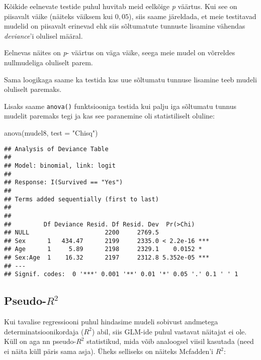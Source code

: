 \documentclass[
]{book}
\newenvironment{Shaded}{\begin{snugshade}}{\end{snugshade}}
\newcommand{\AttributeTok}[1]{\textcolor[rgb]{0.77,0.63,0.00}{#1}}
\newcommand{\FunctionTok}[1]{\textcolor[rgb]{0.00,0.00,0.00}{#1}}
\newcommand{\NormalTok}[1]{#1}
\newcommand{\OtherTok}[1]{\textcolor[rgb]{0.56,0.35,0.01}{#1}}
\newcommand{\SpecialCharTok}[1]{\textcolor[rgb]{0.00,0.00,0.00}{#1}}
\newcommand{\StringTok}[1]{\textcolor[rgb]{0.31,0.60,0.02}{#1}}
\begin{document}
Kõikide eelnevate testide puhul huvitab meid eelkõige \emph{p} väärtus. Kui see on piisavalt väike (näiteks väiksem kui \(0,05\)), siis saame järeldada, et meie testitavad mudelid on piisavalt erinevad ehk siis sõltumatute tunnuste lisamine vähendas \emph{deviance}'i olulisel määral.

Eelnevas näites on \emph{p}- väärtus on väga väike, seega meie mudel on võrreldes nullmudeliga oluliselt parem.

Sama loogikaga saame ka testida kas uue sõltumatu tunnuse lisamine teeb mudeli oluliselt paremaks.

Lisaks saame \texttt{anova()} funktsiooniga testida kui palju iga sõltumatu tunnus mudelit paremaks tegi ja kas see paranemine oli statistiliselt oluline:

\begin{Shaded}
\begin{Highlighting}[]
\FunctionTok{anova}\NormalTok{(mudel8, }\AttributeTok{test =} \StringTok{"Chisq"}\NormalTok{)}
\end{Highlighting}
\end{Shaded}

\begin{verbatim}
## Analysis of Deviance Table
## 
## Model: binomial, link: logit
## 
## Response: I(Survived == "Yes")
## 
## Terms added sequentially (first to last)
## 
## 
##         Df Deviance Resid. Df Resid. Dev  Pr(>Chi)    
## NULL                     2200     2769.5              
## Sex      1   434.47      2199     2335.0 < 2.2e-16 ***
## Age      1     5.89      2198     2329.1    0.0152 *  
## Sex:Age  1    16.32      2197     2312.8 5.352e-05 ***
## ---
## Signif. codes:  0 '***' 0.001 '**' 0.01 '*' 0.05 '.' 0.1 ' ' 1
\end{verbatim}

\hypertarget{pseudo-r2}{%
\subsection{\texorpdfstring{Pseudo-\(R^2\)}{Pseudo-R\^{}2}}\label{pseudo-r2}}

Kui tavalise regressiooni puhul hindasime mudeli sobivust andmetega determinatsioonikordaja (\(R^2\)) abil, siis GLM-ide puhul vastavat näitajat ei ole. Küll on aga nn pseudo-\(R^2\) statistikud, mida võib analoogsel viisil kasutada (need ei näita küll päris sama asja). Üheks selliseks on näiteks Mcfadden'i \(R^2\):

\begin{Shaded}
\end{Shaded}
\end{document}
